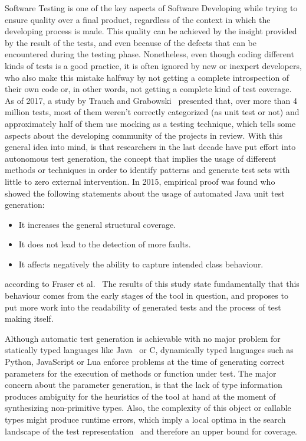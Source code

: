 \documentclass[%
  chapterprefix=false,%
  open=right,%
  twoside=true,%
  paper=a4,%
  logofile={Figures/logo.png},%
  thesistype=master,%
  UKenglish,%
]{se2thesis}
\begin{document}
Software Testing is one of the key aspects of Software Developing while trying to ensure quality over a final product, regardless of the context in which the developing process is made.
This quality can be achieved by the insight provided by the result of the tests, and even because of the defects that can be encountered during the testing phase.
Nonetheless, even though coding different kinds of tests is a good practice, it is often ignored by new or inexpert developers, who also make this mistake halfway by not getting a complete introspection of their own code or, in other words, not getting a complete kind of test coverage.
As of 2017, a study by Trauch and Grabowski~\cite{DBLP:conf/icst/TrautschG17} presented that, over more than 4 million tests, most of them weren't correctly categorized (as unit test or not) and approximately half of them use mocking as a testing technique, which tells some aspects about the developing community of the projects in review. 
With this general idea into mind, is that researchers in the last decade   have put effort into autonomous test generation, the concept that implies the usage of different methods or techniques in order to identify patterns and generate test sets with little to zero   external intervention.
In 2015, empirical proof was found who showed the following statements about the usage of automated Java unit test generation:
\begin{itemize}
  \item It increases the general structural coverage.
  \item It does not lead to the detection of more faults.
  \item It affects negatively the ability to capture intended class behaviour.
\end{itemize}
according to Fraser et al.~\cite{DBLP:journals/tosem/FraserSMAP15}
The results of this study state fundamentally that this behaviour  comes from the early stages of the tool in question, and proposes to put more work into the readability of generated tests and  the process of test making itself.

Although automatic test generation is achievable with no major problem for statically typed languages like Java~\cite{DBLP:journals/tse/FraserA13} or C, dynamically typed languages such as Python, JavaScript or Lua enforce problems at the time of generating correct parameters for the execution of methods or function under test.
The major concern about the parameter generation, is that the lack of type information produces ambiguity for the heuristics of the tool at hand at the moment of synthesizing non-primitive types.
Also, the complexity of this object or callable types might produce runtime errors, which imply a local optima in the search landscape of the test representation~\cite{DBLP:conf/sigsoft/0001O00D21} and therefore an upper bound for coverage.
\end{document}
